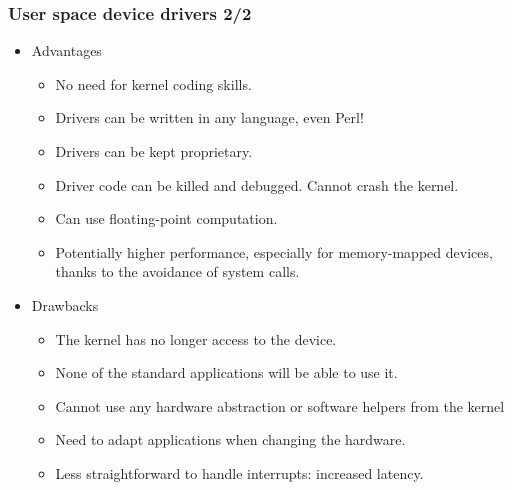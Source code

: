 \begin{frame}
  \frametitle{User space device drivers 2/2}
  \begin{itemize}
  \item Advantages
    \begin{itemize}
    \item No need for kernel coding skills.
    \item Drivers can be written in any language, even Perl!
    \item Drivers can be kept proprietary.
    \item Driver code can be killed and debugged. Cannot crash the
      kernel.
    \item Can use floating-point computation.
    \item Potentially higher performance, especially for
      memory-mapped devices, thanks to the avoidance of system calls.
    \end{itemize}
  \item Drawbacks
    \begin{itemize}
    \item The kernel has no longer access to the device.
    \item None of the standard applications will be able to use it.
    \item Cannot use any hardware abstraction or software helpers from
      the kernel
    \item Need to adapt applications when changing the hardware.
    \item Less straightforward to handle interrupts: increased latency.
    \end{itemize}
  \end{itemize}
\end{frame}
